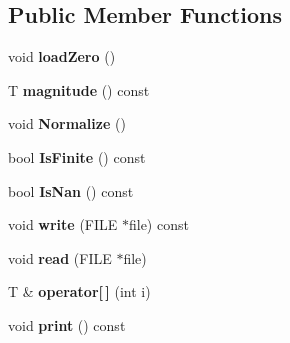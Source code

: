 \subsection*{Public Member Functions}
\begin{DoxyCompactItemize}
\item 
\hypertarget{classmath_1_1vecbase_a09ea04e19618e27e57faf11d94d7c59c}{
void {\bfseries loadZero} ()}
\label{classmath_1_1vecbase_a09ea04e19618e27e57faf11d94d7c59c}

\item 
\hypertarget{classmath_1_1vecbase_a99cd9e1263bd57dff1b580586c7193ba}{
T {\bfseries magnitude} () const }
\label{classmath_1_1vecbase_a99cd9e1263bd57dff1b580586c7193ba}

\item 
\hypertarget{classmath_1_1vecbase_ab620e8c531da5d6c86634fcb108646c1}{
void {\bfseries Normalize} ()}
\label{classmath_1_1vecbase_ab620e8c531da5d6c86634fcb108646c1}

\item 
\hypertarget{classmath_1_1vecbase_a7875c870c844f42aeaca952016a04bc7}{
bool {\bfseries IsFinite} () const }
\label{classmath_1_1vecbase_a7875c870c844f42aeaca952016a04bc7}

\item 
\hypertarget{classmath_1_1vecbase_a74f465a86765df211b97c716bc7162dc}{
bool {\bfseries IsNan} () const }
\label{classmath_1_1vecbase_a74f465a86765df211b97c716bc7162dc}

\item 
\hypertarget{classmath_1_1vecbase_a754b07a9163ae8746053ed8ca51e89c6}{
void {\bfseries write} (FILE $\ast$file) const }
\label{classmath_1_1vecbase_a754b07a9163ae8746053ed8ca51e89c6}

\item 
\hypertarget{classmath_1_1vecbase_a9759523e7304173f8ae57f3a9a30b37a}{
void {\bfseries read} (FILE $\ast$file)}
\label{classmath_1_1vecbase_a9759523e7304173f8ae57f3a9a30b37a}

\item 
\hypertarget{classmath_1_1vecbase_a80d2a8df6f5e4a6647531c98eb8fe595}{
T \& {\bfseries operator\mbox{[}$\,$\mbox{]}} (int i)}
\label{classmath_1_1vecbase_a80d2a8df6f5e4a6647531c98eb8fe595}

\item 
\hypertarget{classmath_1_1vecbase_abe9e88db645742e98774a1a946dbaef5}{
void {\bfseries print} () const }
\label{classmath_1_1vecbase_abe9e88db645742e98774a1a946dbaef5}

\end{DoxyCompactItemize}
